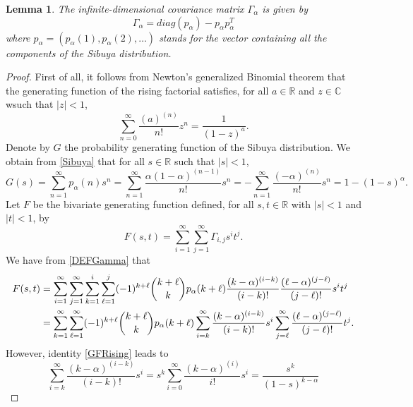 \documentclass[twoside,12pt]{article}
\newcommand{\dR}{\mathbb{R}}
\newcommand{\dC}{\mathbb{C}}
\newtheorem{lem}[thm]{Lemma}
\begin{document}
\begin{lem}
\label{L-COV}
The infinite-dimensional covariance matrix $\Gamma_\alpha$ is given by
\begin{equation}
\label{EXPGammad}
\Gamma_\alpha=diag(p_\alpha)-p_\alpha p_\alpha^T
\end{equation}
where $p_\alpha=(p_\alpha(1),p_\alpha(2),\ldots)$ stands for the vector containing all the components of the Sibuya distribution.
\end{lem}

\begin{proof}
First of all, it follows from Newton’s generalized Binomial theorem that the generating function of the rising factorial satisfies, for all $a\in \dR$ and $z \in \dC$ wsuch that $|z|<1$, 
\begin{equation}
\label{GFRising}
\sum_{n=0}^\infty \frac{(a)^{(n)}}{n!} z^n= \frac{1}{(1-z)^a}.
\end{equation}
Denote by $G$ the probability generating function of the Sibuya distribution. We obtain from \eqref{Sibuya} that for all $s \in \dR$ such that $|s|<1$,
\begin{equation}
\label{PGF-Sibuya}
G(s)= \sum_{n=1}^\infty p_\alpha(n) s^n=\sum_{n=1}^\infty \frac{\alpha (1-\alpha)^{(n-1)}}{n!} s^n
=-\sum_{n=1}^\infty \frac{(-\alpha)^{(n)}}{n!} s^n
=1 -(1-s)^\alpha.
\end{equation}
Let $F$ be the bivariate generating function defined, for all $s,t \in \dR$ with $|s|<1$ and $|t|<1$, by
\begin{equation}
\label{GF-Gamma}
F(s,t)= \sum_{i=1}^\infty \sum_{j=1}^\infty \Gamma_{i,j} s^i t^j.
\end{equation}
We have from \eqref{DEFGamma} that
\begin{align}
F(s,t) &= \sum_{i=1}^\infty \sum_{j=1}^\infty \sum_{k=1}^i \sum_{\ell=1}^j (-1)^{k+\ell} \binom{k+\ell}{k} 
p_\alpha(k+\ell) \frac{(k-\alpha)^{(i-k)}}{(i-k)!} \frac{(\ell-\alpha)^{(j-\ell)}}{(j-\ell)!} s^i t^j \notag \\
&= \sum_{k=1}^\infty \sum_{\ell=1}^\infty (-1)^{k+\ell} \binom{k+\ell}{k} p_\alpha(k+\ell) \sum_{i=k}^\infty \frac{(k-\alpha)^{(i-k)}}{(i-k)!} s^i
\sum_{j=\ell}^\infty \frac{(\ell-\alpha)^{(j-\ell)}}{(j-\ell)!} t^j.
\label{eq:GFF1}
\end{align}
However, identity \eqref{GFRising} leads to
\begin{equation*}
\sum_{i=k}^\infty \frac{(k-\alpha)^{(i-k)}}{(i-k)!} s^i=s^k \sum_{i=0}^\infty \frac{(k-\alpha)^{(i)}}{i!} s^i= \frac{s^k}{(1-s)^{k-\alpha}}
\end{equation*}

\end{proof}
\end{document}
